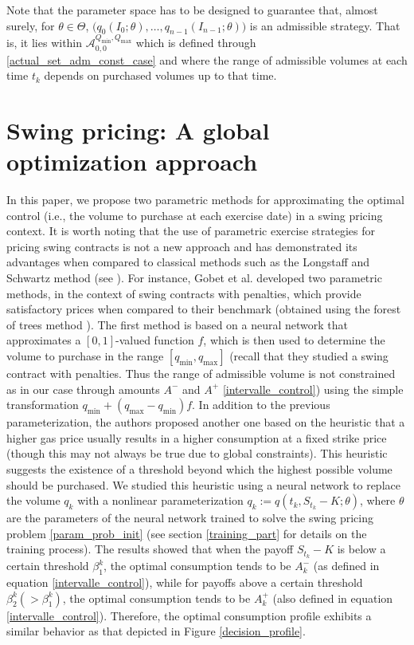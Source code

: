 \documentclass{article}
\numberwithin{equation}{section}
\begin{document}
Note that the parameter space has to be designed to guarantee that, almost surely, for $\theta \in \Theta$, $\big(q_0(I_0; \theta), \ldots, q_{n-1}(I_{n-1}; \theta) \big)$ is an admissible strategy. That is, it lies within $\mathcal{A}_{0, 0}^{Q_{\min}, Q_{\max}}$ which is defined through \eqref{actual_set_adm_const_case} and where the range of admissible volumes at each time $t_k$ depends on purchased volumes up to that time.



\section{Swing pricing: A global optimization approach}
\label{sec2}
\indent

In this paper, we propose two parametric methods for approximating the optimal control (i.e., the volume to purchase at each exercise date) in a swing pricing context. It is worth noting that the use of parametric exercise strategies for pricing swing contracts is not a new approach and has demonstrated its advantages when compared to classical methods such as the Longstaff and Schwartz method (see \cite{BarreraEsteve2006NumericalMF, Longstaff2001ValuingAO}). For instance, Gobet et al. \cite{BarreraEsteve2006NumericalMF} developed two parametric methods, in the context of swing contracts with penalties, which provide satisfactory prices when compared to their benchmark (obtained using the forest of trees method \cite{LariLavassani2002ADV}). The first method is based on a neural network that approximates a $[0,1]$-valued function $f$, which is then used to determine the volume to purchase in the range $[q_{\min}, q_{\max}]$ (recall that they studied a swing contract with penalties. Thus the range of admissible volume is not constrained as in our case through amounts $A^-$ and $A^+$ \eqref{intervalle_control}) using the simple transformation $q_{\min} + (q_{\max} - q_{\min})f$. In addition to the previous parameterization, the authors proposed another one based on the heuristic that a higher gas price usually results in a higher consumption at a fixed strike price (though this may not always be true due to global constraints). This heuristic suggests the existence of a threshold beyond which the highest possible volume should be purchased. We studied this heuristic using a neural network to replace the volume $q_k$ with a nonlinear parameterization $q_k := q(t_k, S_{t_k} - K; \theta)$, where $\theta$ are the parameters of the neural network trained to solve the swing pricing problem \eqref{param_prob_init} (see section \ref{training_part} for details on the training process). The results showed that when the payoff $S_{t_k} - K$ is below a certain threshold $\beta_1^k$, the optimal consumption tends to be $A_k^-$ (as defined in equation \eqref{intervalle_control}), while for payoffs above a certain threshold $\beta_2^k (> \beta_1^k)$, the optimal consumption tends to be $A_k^+$ (also defined in equation \eqref{intervalle_control}). Therefore, the optimal consumption profile exhibits a similar behavior as that depicted in Figure \ref{decision_profile}.
\end{document}
